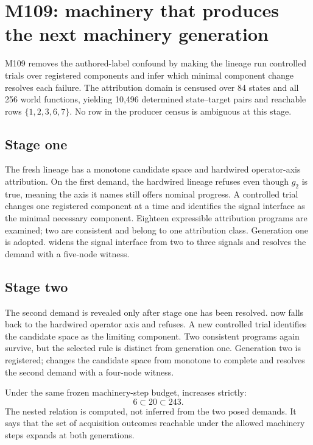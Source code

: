 \section{M109: machinery that produces the next machinery generation}
\label{sec:m109}
M109 removes the authored-label confound by making the lineage run controlled trials over registered components and infer which minimal component change resolves each failure. The attribution domain is censused over 84 states and all 256 world functions, yielding 10,496 determined state--target pairs and reachable rows $\{1,2,3,6,7\}$. No row in the producer census is ambiguous at this stage.

\subsection{Stage one}
The fresh lineage \mzero has a monotone candidate space and hardwired operator-axis attribution. On the first demand, the hardwired lineage refuses even though $g_2$ is true, meaning the axis it names still offers nominal progress. A controlled trial changes one registered component at a time and identifies the signal interface as the minimal necessary component. Eighteen expressible attribution programs are examined; two are consistent and belong to one attribution class. Generation one is adopted. \mone widens the signal interface from two to three signals and resolves the demand with a five-node witness.

\subsection{Stage two}
The second demand is revealed only after stage one has been resolved. \mone now falls back to the hardwired operator axis and refuses. A new controlled trial identifies the candidate space as the limiting component. Two consistent programs again survive, but the selected rule is distinct from generation one. Generation two is registered; \mtwo changes the candidate space from monotone to complete and resolves the second demand with a four-node witness.

Under the same frozen machinery-step budget, \reach increases strictly:
\begin{equation}
6 \subset 20 \subset 243.
\end{equation}
The nested relation is computed, not inferred from the two posed demands. It says that the set of acquisition outcomes reachable under the allowed machinery steps expands at both generations.

